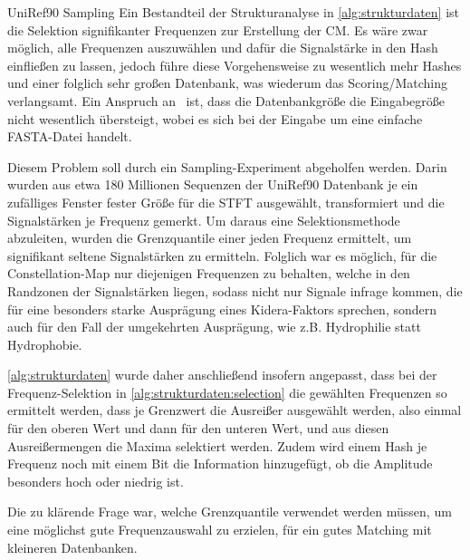     \begin{experiment}{UniRef90 Sampling} %
        \label{exp:uniref90}
        Ein Bestandteil der Strukturanalyse in \autoref{alg:strukturdaten} ist die Selektion signifikanter Frequenzen zur Erstellung der \ac{CM}. Es wäre zwar möglich, alle Frequenzen auszuwählen und dafür die Signalstärke in den Hash einfließen zu lassen, jedoch führe diese Vorgehensweise zu wesentlich mehr Hashes und einer folglich sehr großen Datenbank, was wiederum das Scoring/Matching verlangsamt. Ein Anspruch an \protfin\ ist, dass die Datenbankgröße die Eingabegröße nicht wesentlich übersteigt, wobei es sich bei der Eingabe um eine einfache FASTA-Datei handelt.

        Diesem Problem soll durch ein Sampling-Experiment abgeholfen werden. Darin wurden aus etwa 180 Millionen Sequenzen der UniRef90 Datenbank je ein zufälliges Fenster fester Größe für die \ac{STFT} ausgewählt, transformiert und die Signalstärken je Frequenz gemerkt. Um daraus eine Selektionsmethode abzuleiten, wurden die Grenzquantile einer jeden Frequenz ermittelt, um signifikant seltene Signalstärken zu ermitteln. Folglich war es möglich, für die Constellation-Map nur diejenigen Frequenzen zu behalten, welche in den Randzonen der Signalstärken liegen, sodass nicht nur Signale infrage kommen, die für eine besonders starke Ausprägung eines Kidera-Faktors sprechen, sondern auch für den Fall der umgekehrten Ausprägung, wie z.B. Hydrophilie statt Hydrophobie.

        \autoref{alg:strukturdaten} wurde daher anschließend insofern angepasst, dass bei der Frequenz-Selektion in \autoref{alg:strukturdaten:selection} die gewählten Frequenzen so ermittelt werden, dass je Grenzwert die Ausreißer ausgewählt werden, also einmal für den oberen Wert und dann für den unteren Wert, und aus diesen Ausreißermengen die Maxima selektiert werden. Zudem wird einem Hash je Frequenz noch mit einem Bit die Information hinzugefügt, ob die Amplitude besonders hoch oder niedrig ist.

        Die zu klärende Frage war, welche Grenzquantile verwendet werden müssen, um eine möglichst gute Frequenzauswahl zu erzielen, für ein gutes Matching mit kleineren Datenbanken.
    \end{experiment}
